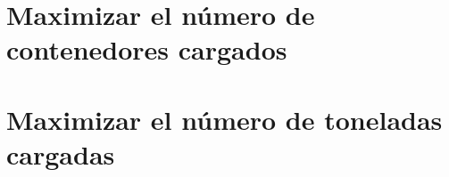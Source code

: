 
\section{Maximizar el número de contenedores cargados}
\section{Maximizar el número de toneladas cargadas}
